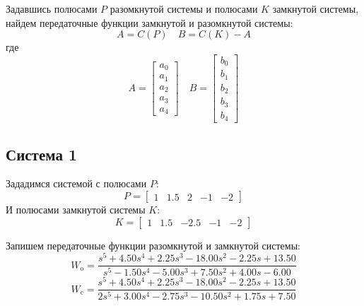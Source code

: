 Задавшись полюсами $P$ разомкнутой системы и полюсами $K$ замкнутой системы, найдем передаточные
функции замкнутой и разомкнутой системы:
\begin{equation}
    A = C(P) \quad B = C(K) - A 
\end{equation}
где 
\begin{equation}
    A = \begin{bmatrix}
         a_0 \\ a_1 \\ a_2 \\ a_3 \\ a_4
    \end{bmatrix} \quad 
    B = \begin{bmatrix}
        b_0 \\ b_1 \\ b_2 \\ b_3 \\ b_4
    \end{bmatrix}
\end{equation}


\subsection{Система 1}
Зададимся системой с полюсами $P$:
\begin{equation}
    P = \begin{bmatrix}
        1 & 1.5 & 2 & -1 & -2
    \end{bmatrix}
\end{equation}
И полюсами замкнутой системы $K$:
\begin{equation}
    K = \begin{bmatrix}
        1 & 1.5 & -2.5 & -1 & -2
    \end{bmatrix}
\end{equation}

Запишем передаточные функции разомкнутой и замкнутой системы:
\begin{equation}
    W_{\text{o}} = \frac{s^5 +4.50s^4 +2.25s^3 -18.00s^2 -2.25s +13.50}{s^5 -1.50s^4 -5.00s^3 +7.50s^2 +4.00s -6.00}
\end{equation}
\begin{equation}
    W_{\text{c}} = \frac{s^5 +4.50s^4 +2.25s^3 -18.00s^2 -2.25s +13.50}{2s^5 +3.00s^4 -2.75s^3 -10.50s^2 +1.75s +7.50}
\end{equation}

